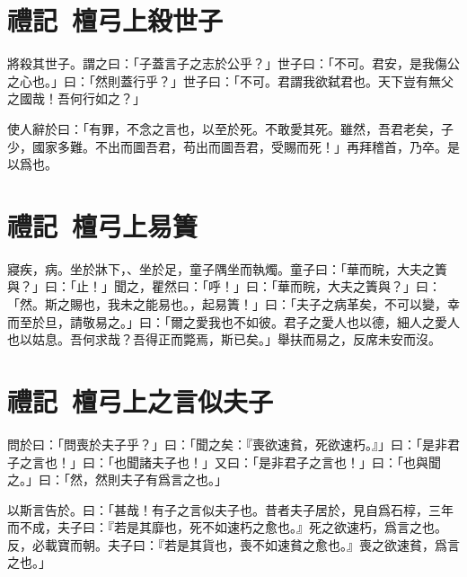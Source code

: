 \section[晉獻公殺世子申生\quad{\small 禮記 檀弓上}]{{\normalsize 禮記\ 檀弓上}\quad {}殺世子}
將殺其世子。謂之曰：「子蓋言子之志於公乎？」世子曰：「不可。君安，是我傷公之心也。」曰：「然則蓋行乎？」世子曰：「不可。君謂我欲弑君也。天下豈有無父之國哉！吾何行如之？」

使人辭於曰：「有罪，不念之言也，以至於死。不敢愛其死。雖然，吾君老矣，子少，國家多難。不出而圖吾君，苟出而圖吾君，受賜而死！」再拜稽首，乃卒。是以爲也。

\section[曾子易簀\quad{\small 禮記 檀弓上}]{{\normalsize 禮記\ 檀弓上}\quad {}易簀}
寢疾，病。坐於牀下，、坐於足，童子隅坐而執燭。童子曰：「華而睆，大夫之簀與？」曰：「止！」聞之，瞿然曰：「呼！」曰：「華而睆，大夫之簀與？」曰：「然。斯之賜也，我未之能易也。，起易簀！」曰：「夫子之病革矣，不可以變，幸而至於旦，請敬易之。」曰：「爾之愛我也不如彼。君子之愛人也以德，細人之愛人也以姑息。吾何求哉？吾得正而斃焉，斯已矣。」舉扶而易之，反席未安而沒。

\section[有子之言似夫子\quad{\small 禮記 檀弓上}]{{\normalsize 禮記\ 檀弓上}\quad {}之言似夫子}
問於曰：「問喪於夫子乎？」曰：「聞之矣：『喪欲速貧，死欲速朽。』」曰：「是非君子之言也！」曰：「也聞諸夫子也！」又曰：「是非君子之言也！」曰：「也與聞之。」曰：「然，然則夫子有爲言之也。」

以斯言告於。曰：「甚哉！有子之言似夫子也。昔者夫子居於，見自爲石椁，三年而不成，夫子曰：『若是其靡也，死不如速朽之愈也。』死之欲速朽，爲言之也。反，必載寶而朝。夫子曰：『若是其貨也，喪不如速貧之愈也。』喪之欲速貧，爲言之也。」

